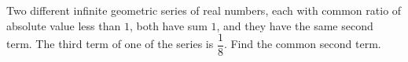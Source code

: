Two different infinite geometric series of real numbers, each with common ratio of absolute value less than $1$, both have sum $1$, and they have the same second term. The third term of one of the series is $\dfrac18$. Find the common second term.
